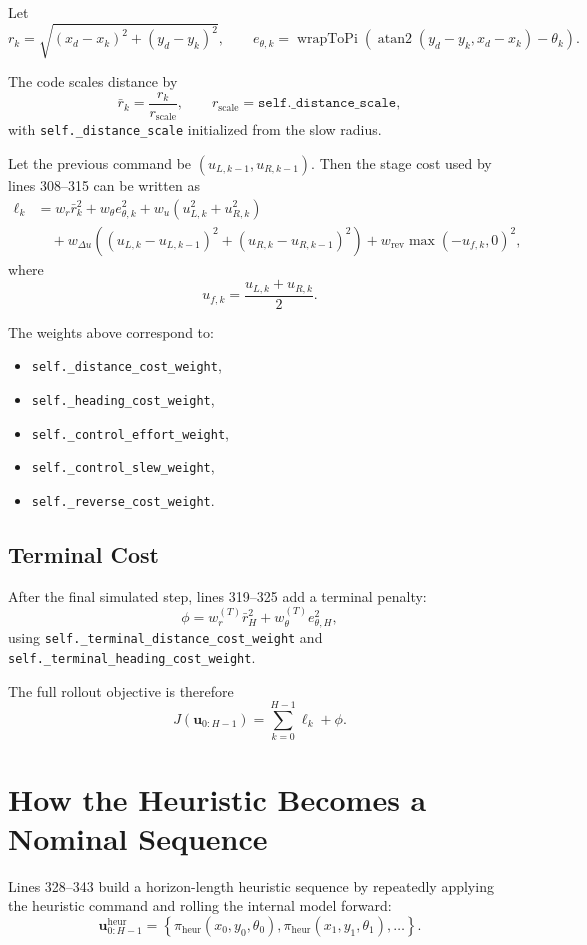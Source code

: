 \documentclass[11pt]{article}
\begin{document}
Let
\[
r_k = \sqrt{(x_d - x_k)^2 + (y_d - y_k)^2},
\qquad
e_{\theta,k} = \operatorname{wrapToPi}\!\left(\operatorname{atan2}(y_d-y_k, x_d-x_k) - \theta_k\right).
\]

The code scales distance by
\[
\bar{r}_k = \frac{r_k}{r_{\mathrm{scale}}},
\qquad
r_{\mathrm{scale}} = \texttt{self.\_distance\_scale},
\]
with \texttt{self.\_distance\_scale} initialized from the slow radius.

Let the previous command be $(u_{L,k-1},u_{R,k-1})$. Then the stage cost used
by lines 308--315 can be written as
\begin{align*}
\ell_k
&=
w_r \bar{r}_k^2
+ w_\theta e_{\theta,k}^2
+ w_u \left(u_{L,k}^2 + u_{R,k}^2\right) \\
&\quad
+ w_{\Delta u} \left((u_{L,k} - u_{L,k-1})^2 + (u_{R,k} - u_{R,k-1})^2\right)
+ w_{\mathrm{rev}} \max(-u_{f,k}, 0)^2,
\end{align*}
where
\[
u_{f,k} = \frac{u_{L,k} + u_{R,k}}{2}.
\]

The weights above correspond to:
\begin{itemize}
\item \texttt{self.\_distance\_cost\_weight},
\item \texttt{self.\_heading\_cost\_weight},
\item \texttt{self.\_control\_effort\_weight},
\item \texttt{self.\_control\_slew\_weight},
\item \texttt{self.\_reverse\_cost\_weight}.
\end{itemize}

\subsection{Terminal Cost}

After the final simulated step, lines 319--325 add a terminal penalty:
\[
\phi =
w_r^{(T)} \bar{r}_H^2
+ w_\theta^{(T)} e_{\theta,H}^2,
\]
using
\texttt{self.\_terminal\_distance\_cost\_weight} and
\texttt{self.\_terminal\_heading\_cost\_weight}.

The full rollout objective is therefore
\[
J(\mathbf{u}_{0:H-1}) = \sum_{k=0}^{H-1} \ell_k + \phi.
\]

\section{How the Heuristic Becomes a Nominal Sequence}

Lines 328--343 build a horizon-length heuristic sequence by repeatedly applying
the heuristic command and rolling the internal model forward:
\[
\mathbf{u}^{\mathrm{heur}}_{0:H-1}
=
\left\{
\pi_{\mathrm{heur}}(x_0,y_0,\theta_0),
\pi_{\mathrm{heur}}(x_1,y_1,\theta_1),
\dots
\right\}.
\]
\end{document}
